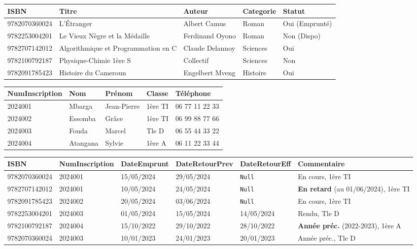\documentclass[11pt]{article}
\begin{document}
\begin{exoresolu}
\begin{center}
\begin{tabular}{|l|l|l|l|l|}\hline
\textbf{ISBN} & \textbf{Titre} & \textbf{Auteur} & \textbf{Categorie} & \textbf{Statut} \\ \hline
9782070360024 & L'Étranger & Albert Camus & Roman & Oui (Emprunté) \\ \hline
9782253004201 & Le Vieux Nègre et la Médaille & Ferdinand Oyono & Roman & Non (Dispo) \\ \hline
9782707142012 & Algorithmique et Programmation en C & Claude Delannoy & Sciences & Oui \\ \hline
9782100792187 & Physique-Chimie 1ère S & Collectif & Sciences & Non \\ \hline
9782091785423 & Histoire du Cameroun & Engelbert Mveng & Histoire & Oui \\ \hline
\end{tabular}
\end{center}

\begin{center}
\begin{tabular}{|l|l|l|l|l|}\hline
\textbf{NumInscription} & \textbf{Nom} & \textbf{Prénom} & \textbf{Classe} & \textbf{Téléphone} \\ \hline
2024001 & Mbarga & Jean-Pierre & 1ère TI & 06 77 11 22 33 \\ \hline
2024002 & Essomba & Grâce & 1ère TI & 06 99 88 77 66 \\ \hline
2024003 & Fouda & Marcel & Tle D & 06 55 44 33 22 \\ \hline
2024004 & Atangana & Sylvie & 1ère A & 06 11 22 33 44 \\ \hline
\end{tabular}
\end{center}

\begin{center}
\begin{tabularx}{\linewidth}{|l|l|l|l|l|X|}\hline
\textbf{ISBN} & \textbf{NumInscription} & \textbf{DateEmprunt} & \textbf{DateRetourPrev} & \textbf{DateRetourEff} & \textbf{Commentaire} \\ \hline
9782070360024 & 2024001 & 15/05/2024 & 29/05/2024 & \texttt{Null} & En cours, 1ère TI \\ \hline
9782707142012 & 2024001 & 10/05/2024 & 24/05/2024 & \texttt{Null} & \textbf{En retard} (au 01/06/2024), 1ère TI \\ \hline
9782091785423 & 2024002 & 20/05/2024 & 03/06/2024 & \texttt{Null} & En cours, 1ère TI \\ \hline
9782253004201 & 2024003 & 01/05/2024 & 15/05/2024 & 14/05/2024 & Rendu, Tle D \\ \hline
9782100792187 & 2024004 & 15/10/2022 & 29/10/2022 & 28/10/2022 & \textbf{Année préc.} (2022-2023), 1ère A \\ \hline
9782070360024 & 2024003 & 10/01/2023 & 24/01/2023 & 20/01/2023 & Année préc., Tle D \\ \hline
\end{tabularx}
\end{center}


\end{exoresolu}
\end{document}
